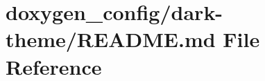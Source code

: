 \hypertarget{doxygen__config_2dark-theme_2README_8md}{\section{doxygen\-\_\-config/dark-\/theme/\-R\-E\-A\-D\-M\-E.md File Reference}
\label{doxygen__config_2dark-theme_2README_8md}
}
